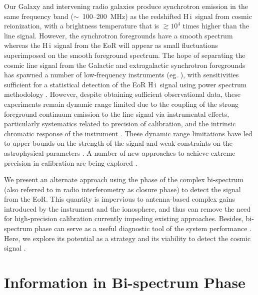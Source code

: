 \documentclass[
reprint,
superscriptaddress,
amsmath,
amssymb,
aps,
prd
]{revtex4-1}
\newcommand{\HI}{H\,{\sc i}}
\begin{document}
Our Galaxy and intervening radio galaxies produce synchrotron emission in the same frequency band ($\sim$~100--200~MHz) as the redshifted \HI\ signal from cosmic reionization, with a brightness temperature that is $\gtrsim 10^4$ times higher than the line signal. However, the synchrotron foregrounds have a smooth spectrum whereas the \HI\ signal from the EoR will appear as small fluctuations superimposed on the smooth foreground spectrum. The hope of separating the cosmic line signal from the Galactic and extragalactic synchrotron foregrounds has spawned a number of low-frequency instruments (eg. \cite{par10,tin13,van13}), with sensitivities sufficient for a statistical detection of the EoR \HI\ signal using power spectrum methodology \cite{bea13,thy13}.  However, despite obtaining sufficient observational data, these experiments remain dynamic range limited due to the coupling of the strong foreground continuum emission to the line signal via instrumental effects, particularly systematics related to precision of calibration, and the intrinsic chromatic response of the instrument \cite{barry16,thy15a,thy15b,thy16,dat09,dat10,tro16}. These dynamic range limitations have led to upper bounds on the strength of the signal \cite{pac13,ali15,patil17} and weak constraints on the astrophysical parameters \cite{pob15}. A number of new approaches to achieve extreme precision in calibration are being explored \cite{liu10,zhe14,sie17,dil17}. 

We present an alternate approach using the phase of the complex bi-spectrum (also referred to in radio interferometry as closure phase) to detect the signal from the EoR. This quantity is impervious to antenna-based complex gains introduced by the instrument and the ionosphere, and thus can remove the need for high-precision calibration currently impeding existing approaches. Besides, bi-spectrum phase can serve as a useful diagnostic tool of the system performance \cite[see also companion paper][hereafter referred to as paper I]{car18}. Here, we explore its potential as a strategy and its viability to detect the cosmic signal \cite[see also][]{car16}.

\section{Information in Bi-spectrum Phase}\label{sec:CPinfo}
\end{document}
